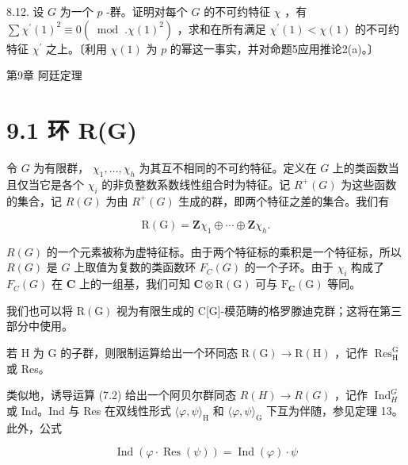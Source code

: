\documentclass[10pt]{article}
\begin{document}
8.12. 设 \(G\) 为一个 \(p\) -群。证明对每个 \(G\) 的不可约特征 \(\chi\) ，有 \(\sum {\chi }^{\prime }{\left( 1\right) }^{2} \equiv  0\left( {{\;\operatorname{mod}\;.}\chi {\left( 1\right) }^{2}}\right)\) ，求和在所有满足 \({\chi }^{\prime }\left( 1\right)  < \chi \left( 1\right)\) 的不可约特征 \({\chi }^{\prime }\) 之上。〔利用 \(\chi \left( 1\right)\) 为 \(p\) 的幂这一事实，并对命题5应用推论2(a)。〕

第9章 阿廷定理

\section*{9.1 环 R(G)}

令 \(G\) 为有限群， \({\chi }_{1},\ldots ,{\chi }_{h}\) 为其互不相同的不可约特征。定义在 \(G\) 上的类函数当且仅当它是各个 \({\chi }_{i}\) 的非负整数系数线性组合时为特征。记 \({R}^{ + }\left( G\right)\) 为这些函数的集合，记 \(R\left( G\right)\) 为由 \({R}^{ + }\left( G\right)\) 生成的群，即两个特征之差的集合。我们有

\[
\mathrm{R}\left( \mathrm{G}\right)  = \mathbf{Z}{\chi }_{1} \oplus  \cdots  \oplus  \mathbf{Z}{\chi }_{h}.
\]

\(R\left( G\right)\) 的一个元素被称为虚特征标。由于两个特征标的乘积是一个特征标，所以 \(R\left( G\right)\) 是 \(G\) 上取值为复数的类函数环 \({F}_{C}\left( G\right)\) 的一个子环。由于 \({\chi }_{i}\) 构成了 \({F}_{C}\left( G\right)\) 在 \(\mathbf{C}\) 上的一组基，我们可知 \(\mathbf{C} \otimes  \mathrm{R}\left( \mathrm{G}\right)\) 可与 \({\mathrm{F}}_{\mathbf{C}}\left( \mathrm{G}\right)\) 等同。

我们也可以将 \(\mathrm{R}\left( \mathrm{G}\right)\) 视为有限生成的 C[G]-模范畴的格罗滕迪克群；这将在第三部分中使用。

若 \(\mathrm{H}\) 为 \(\mathrm{G}\) 的子群，则限制运算给出一个环同态 \(\mathrm{R}\left( \mathrm{G}\right)  \rightarrow  \mathrm{R}\left( \mathrm{H}\right)\) ，记作 \({\operatorname{Res}}_{\mathrm{H}}^{\mathrm{G}}\) 或 Res。

类似地，诱导运算 (7.2) 给出一个阿贝尔群同态 \(R\left( H\right)  \rightarrow  R\left( G\right)\) ，记作 \({\operatorname{Ind}}_{H}^{G}\) 或 Ind。Ind 与 Res 在双线性形式 \(\langle \varphi ,\psi {\rangle }_{\mathrm{H}}\) 和 \(\langle \varphi ,\psi {\rangle }_{\mathrm{G}}\) 下互为伴随，参见定理 13。此外，公式

\[
\operatorname{Ind}\left( {\varphi  \cdot  \operatorname{Res}\left( \psi \right) }\right)  = \operatorname{Ind}\left( \varphi \right)  \cdot  \psi
\]
\end{document}
